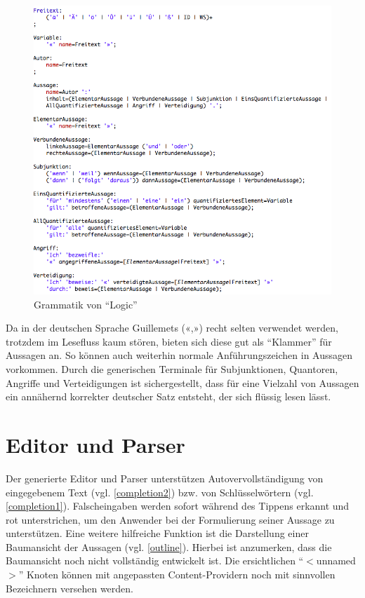 \documentclass[11pt,a4paper,bibtotocnumbered]{scrreprt}
\begin{document}
\begin{figure}[htbp]
\centering
\includegraphics[width=1\textwidth]{img/grammatik.png}
\caption{Grammatik von \enquote{Logic}}
\label{grammatik}
\end{figure}

Da in der deutschen Sprache Guillemets («,») recht selten verwendet werden, trotzdem im Lesefluss kaum stören, bieten sich diese gut als \enquote{Klammer} für Aussagen an.
So können auch weiterhin normale Anführungszeichen in Aussagen vorkommen.
Durch die generischen Terminale für Subjunktionen, Quantoren, Angriffe und Verteidigungen ist sichergestellt, dass für eine Vielzahl von Aussagen ein annähernd korrekter deutscher Satz entsteht, der sich flüssig lesen lässt.


\section{Editor und Parser}

Der generierte Editor und Parser unterstützen Autovervollständigung von eingegebenem Text (vgl. \autoref{completion2}) bzw. von Schlüsselwörtern (vgl. \autoref{completion1}).
Falscheingaben werden sofort während des Tippens erkannt und rot unterstrichen, um den Anwender bei der Formulierung seiner Aussage zu unterstützen.
Eine weitere hilfreiche Funktion ist die Darstellung einer Baumansicht der Aussagen (vgl. \autoref{outline}).
Hierbei ist anzumerken, dass die Baumansicht noch nicht vollständig entwickelt ist.
Die ersichtlichen \enquote{$<$unnamed$>$} Knoten können mit angepassten Content-Providern noch mit sinnvollen Bezeichnern versehen werden.
\end{document}
